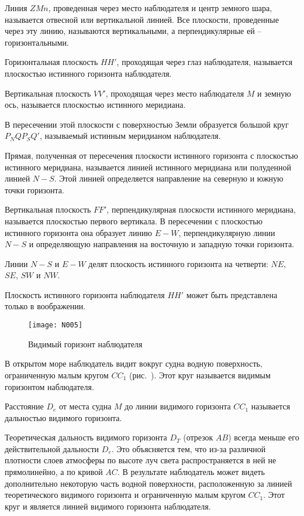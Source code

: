 Линия $ZMn$, проведенная через место наблюдателя и центр земного шара, называется отвесной или вертикальной линией. Все плоскости, проведенные через эту линию, называются вертикальными, а перпендикулярные ей \--- горизонтальными. 

Горизонтальная плоскость $HH'$, проходящая через глаз наблюдателя, называется плоскостью истинного горизонта наблюдателя. 

Вертикальная плоскость $VV'$, проходящая через место наблюдателя $M$ и земную ось, называется плоскостью истинного меридиана. 

В пересечении этой плоскости с поверхностью Земли образуется большой круг $P_NQP_SQ'$, называемый истинным меридианом наблюдателя. 

Прямая, полученная от пересечения плоскости истинного горизонта с плоскостью истинного меридиана, называется линией истинного меридиана или полуденной линией $N-S$. Этой линией определяется направление на северную и южную точки горизонта. 

Вертикальная плоскость $FF'$, перпендикулярная плоскости истинного меридиана, называется плоскостью первого вертикала. В пересечении с плоскостью истинного горизонта она образует линию $E-W$, перпендикулярную линии $N-S$ и определяющую направления на восточную и западную точки горизонта. 

Линии $N-S$ и $E-W$ делят плоскость истинного горизонта на четверти: $NE$, $SE$, $SW$ и $NW$. 

Плоскость истинного горизонта наблюдателя $HH'$ может быть представлена только в воображении. 

\begin{figure}[htb]
  \centering{}
  \texttt{[image: N005]}
  \caption{Видимый горизонт наблюдателя}
  \label{fig:N5}
\end{figure}

В открытом море наблюдатель видит вокруг судна водную поверхность, ограниченную малым кругом $CC_1$ (рис.~). Этот круг называется видимым горизонтом наблюдателя. 

Расстояние $D_e$ от места судна $M$ до линии видимого горизонта $CC_1$ называется дальностью видимого горизонта. 

Теоретическая дальность видимого горизонта $D_T$ (отрезок $AB$) всегда меньше его действительной дальности $D_e$. Это объясняется тем, что из-за различной плотности слоев атмосферы по высоте луч света распространяется в ней не прямолинейно, а по кривой $AC$. В результате наблюдатель может видеть дополнительно некоторую часть водной поверхности, расположенную за линией теоретического видимого горизонта и ограниченную малым кругом $CC_1$. Этот круг и является линией видимого горизонта наблюдателя. 

